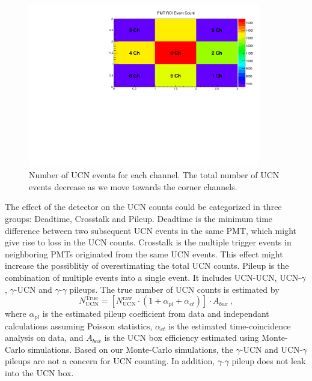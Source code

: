 \begin{figure}[h!]
  \centering
  \includegraphics[width=0.9\textwidth]{channelcounts.pdf}
  \caption{Number of UCN events for each channel. The total number of
    UCN events decrease as we move towards the corner channels.  }
  \label{fig:channelcounts}
\end{figure}


The effect of the detector on the UCN counts could be categorized in
three groups: Deadtime, Crosstalk and Pileup. Deadtime is the minimum
time difference between two subsequent UCN events in the same PMT,
which might give rise to loss in the UCN counts. Crosstalk is the
multiple trigger events in neighboring PMTs originated from the same
UCN events. This effect might increase the possiblitiy of
overestimating the total UCN counts. Pileup is the combination of
multiple events into a single event. It includes UCN-UCN,
UCN-$\gamma$, $\gamma$-UCN and $\gamma$-$\gamma$ pileups. The true
number of UCN counts is estimated by
\begin{equation}
  \label{eqn:trueUCN}
  N^{\mathrm{True}}_{\mathrm{UCN}} = \left [ N^{\mathrm{raw}}_{\mathrm{UCN}} \cdot \left( 1 + \alpha_{pl} + \alpha_{ct}\right) \right] \cdot A_{box}~,
\end{equation}
where $\alpha_{pl}$ is the estimated pileup coefficient from data and
independant calculations assuming Poisson statistics, $\alpha_{ct}$ is
the estimated time-coincidence analysis on data, and $A_{box}$ is the
UCN box efficiency estimated using Monte-Carlo simulations. Based on
our Monte-Carlo simulations, the $\gamma$-UCN and UCN-$\gamma$ pileups
are not a concern for UCN counting. In addition, $\gamma$-$\gamma$
pileup does not leak into the UCN box.

